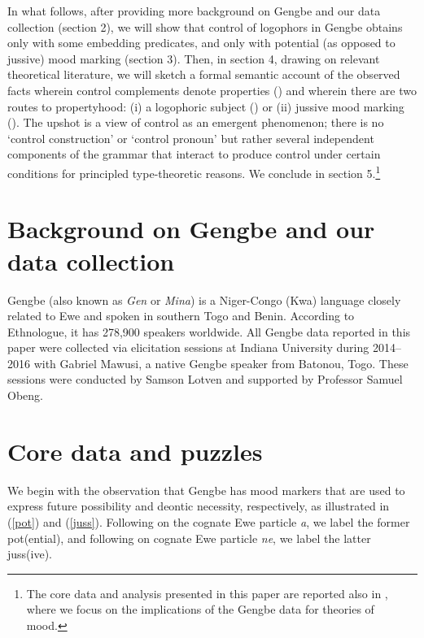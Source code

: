 \documentclass[output=paper
,modfonts
,nonflat]{langsci/langscibook}
\newcommand{\á}{\'{ã}}
\newcommand{\É}{\'{\~{ε}}}
\newcommand{\È}{\`{\~{ε}}}
\newcommand{\í}{\'{\~{i}}}
\newcommand{\ì}{\`{\~{i}}}
\newcommand{\Ó}{\'{\~{ɔ}}}
\newcommand{\Ò}{\`{\~{ɔ}}}
\newcommand{\ú}{\'{ũ}}
\newcommand{\ù}{\`{ũ}}
\begin{document}
In what follows, after providing more background on Gengbe and our data collection (section 2), we will show that control of  logophors in Gengbe obtains only with some embedding predicates, and only with potential (as opposed to jussive) mood marking (section 3). Then, in section 4, drawing on  relevant theoretical literature, we will sketch a formal semantic account of the observed facts wherein control complements denote properties (\citealt{chierchia84, dowty85}) and wherein there are two routes to propertyhood: (i) a logophoric subject (\citealt{pearson15}) or (ii) jussive mood marking (\citealt{zpp12}). The upshot is a view of control as an emergent phenomenon; there is no `control construction' or `control pronoun' but rather several independent components of the grammar that interact to produce control under certain conditions for principled type-theoretic reasons. We conclude in section 5.\footnote{The core data and analysis presented in this paper are reported also in \cite{gl17}, where we focus on the implications of the Gengbe data for theories of mood.}



\section{Background on Gengbe and our data collection}


Gengbe (also known as {\em Gen} or {\em Mina}) is a Niger-Congo (Kwa) language closely related to Ewe and spoken in southern Togo and Benin. According to Ethnologue, it has 278,900 speakers worldwide.  All Gengbe data reported in this paper were collected via elicitation sessions at Indiana University during 2014--2016 with Gabriel Mawusi, a native Gengbe speaker from Batonou, Togo. These sessions were conducted by Samson Lotven and supported by Professor Samuel Obeng.



\section{Core data and puzzles}

We begin with the observation that Gengbe has mood markers that are used to express future possibility and deontic necessity, respectively, as illustrated in (\ref{pot}) and (\ref{juss}). Following \cite{essegbey08} on the  cognate  Ewe particle {\em a}, we label the former {\sc pot}({\sc ential}), and following \cite{ameka08} on  cognate Ewe particle {\em ne}, we label the latter {\sc juss}({\sc ive}).
\end{document}
